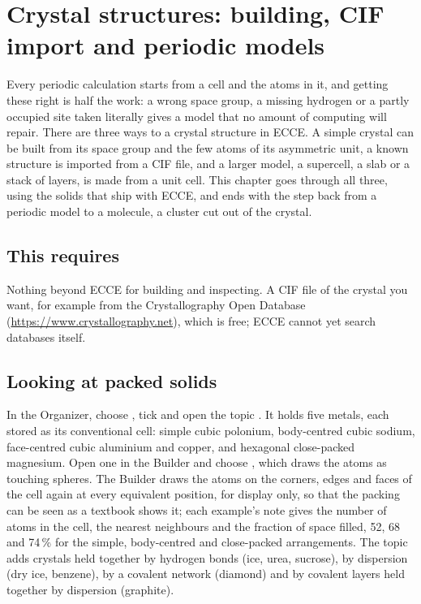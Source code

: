 \chapter{Crystal structures: building, CIF import and periodic models}
\label{ch:crystals}

Every periodic calculation starts from a cell and the atoms in it, and getting these right is half the work: a wrong space group, a missing hydrogen or a partly occupied site taken literally gives a model that no amount of computing will repair. There are three ways to a crystal structure in ECCE. A simple crystal can be built from its space group and the few atoms of its asymmetric unit, a known structure is imported from a CIF file, and a larger model, a supercell, a slab or a stack of layers, is made from a unit cell. This chapter goes through all three, using the solids that ship with ECCE, and ends with the step back from a periodic model to a molecule, a cluster cut out of the crystal.

\section*{This requires}
Nothing beyond ECCE for building and inspecting. A CIF file of the crystal you want, for example from the Crystallography Open Database (\url{https://www.crystallography.net}), which is free; ECCE cannot yet search databases itself.

\section{Looking at packed solids}
In the Organizer, choose , tick  and open the topic . It holds five metals, each stored as its conventional cell: simple cubic polonium, body-centred cubic sodium, face-centred cubic aluminium and copper, and hexagonal close-packed magnesium. Open one in the Builder and choose , which draws the atoms as touching spheres. The Builder draws the atoms on the corners, edges and faces of the cell again at every equivalent position, for display only, so that the packing can be seen as a textbook shows it; each example's note gives the number of atoms in the cell, the nearest neighbours and the fraction of space filled, 52, 68 and 74\,\% for the simple, body-centred and close-packed arrangements. The topic  adds crystals held together by hydrogen bonds (ice, urea, sucrose), by dispersion (dry ice, benzene), by a covalent network (diamond) and by covalent layers held together by dispersion (graphite).

